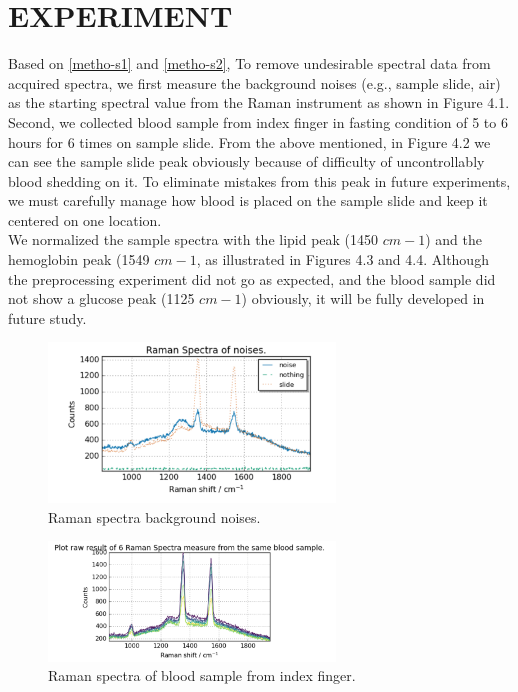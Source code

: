 \setlength{\footskip}{8mm}

\chapter{EXPERIMENT}

Based on \ref{metho-s1} and \ref{metho-s2}, To remove undesirable spectral data from acquired spectra, we first measure the background noises (e.g., sample slide, air) as the starting spectral value from the Raman instrument as shown in Figure 4.1.
\\
Second, we collected blood sample from index finger in fasting condition of 5 to 6 hours for 6 times on sample slide. From the above mentioned, in Figure 4.2 we can see the sample slide peak obviously because of difficulty of uncontrollably blood shedding on it. To eliminate mistakes from this peak in future experiments, we must carefully manage how blood is placed on the sample slide and keep it centered on one location.
\\
We normalized the sample spectra with the lipid peak (1450 $cm-1$) and the hemoglobin peak (1549 $cm-1$, as illustrated in Figures 4.3 and 4.4. Although the preprocessing experiment did not go as expected, and the blood sample did not show a glucose peak (1125 $cm-1$) obviously, it will be fully developed in future study.

\begin{figure}
    \caption{Raman spectra background noises.}
    \centerline{\includegraphics[width=3in]{figures/background-noise.png}} \label{fig:bgnoise}
\end{figure}


\begin{figure}
    \caption{Raman spectra of blood sample from index finger.}
    \centerline{\includegraphics[width=3in]{figures/bloodsample.png}} \label{fig:bloodsample}
\end{figure}

